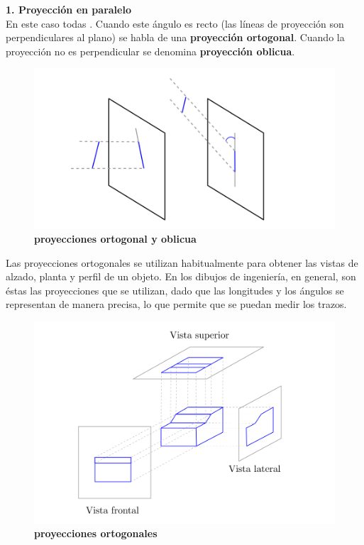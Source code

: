 \textbf{1. Proyección en paralelo }\\
En este caso todas  \citep{Ramos2011}. Cuando este ángulo es recto (las líneas de proyección son perpendiculares al plano) se habla de una \textbf{proyección ortogonal}. Cuando la proyección no es perpendicular se denomina \textbf{proyección oblicua}.

\begin{figure}[h]
    \includegraphics[width=12cm]{Img/GEO/geo-per-2.png}
    \centering
    \caption{\footnotesize{\textbf{proyecciones ortogonal y oblicua}}}
    \label{geo-per2}
\end{figure}

Las proyecciones ortogonales se utilizan habitualmente para obtener las vistas de alzado, planta y perfil de un objeto. En los dibujos de ingeniería, en general, son éstas las proyecciones que se utilizan, dado que las longitudes y los ángulos se representan de manera precisa, lo que permite que se puedan medir los trazos.

\begin{figure}[h]
    \includegraphics[width=12cm]{Img/GEO/geo-per-3.png}
    \centering
    \caption{\footnotesize{\textbf{proyecciones ortogonales}}}
    \label{geo-per3}
\end{figure}

